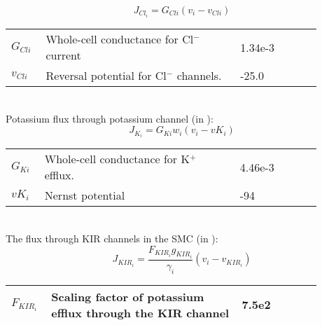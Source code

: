 \begin{equation} \label{eq:JCli}
J_{Cl_{i}} = G_{Cli} \left(  v_{i} - v_{Cli}  \right) 
\end{equation}
%
\begin{table}[h!]
\centering
\begin{tabular}{| p{0.09\linewidth} | >{\footnotesize} p{0.57\linewidth} | >{\footnotesize} p{0.2\linewidth} | >{\footnotesize} p{0.02\linewidth} |}
\arrayrulecolor{lightgrey}\hline
$G_{Cli}$      			& Whole-cell conductance for Cl$^{-}$ current		& 1.34e-3 \uMpmVs	&\cite{Koenigsberger2006} \\
$v_{Cli}$      			& Reversal potential for Cl$^{-}$ channels.			& -25.0 \mV			&\cite{Koenigsberger2006} \\
\hline
\end{tabular}
\label{tab:JCli}
\end{table}
\\
%
Potassium flux through potassium channel (in \uMs):
\begin{equation} \label{eq:JKi}
J_{K_{i}}= G_{Ki} w_{i} \left(  v_{i} - vK_i  \right) 
\end{equation}
%
\begin{table}[h!]
\centering
\begin{tabular}{| p{0.09\linewidth} | >{\footnotesize} p{0.57\linewidth} | >{\footnotesize} p{0.2\linewidth} | >{\footnotesize} p{0.02\linewidth} |}
\arrayrulecolor{lightgrey}\hline
$G_{Ki}$      			& Whole-cell conductance for K$^{+}$ efflux.			& 4.46e-3 \uMpmVs	&\cite{Koenigsberger2005} \\
$vK_i$      			& Nernst potential										& -94 \mV	&\cite{Koenigsberger2005} \\
\hline
\end{tabular}
\label{tab:JKi}
\end{table}
\\
The flux through KIR channels in the SMC (in \uMs): 
\begin{equation} \label{eq:JKIRi}
J_{KIR_{i}} =  \frac{F_{KIR_{i}} g_{KIR_{i}}}{\gamma_{i}}( v_{i} - v_{KIR_{i}})
\end{equation}
%
\begin{table}[h!]
\centering
\begin{tabular}{| p{0.09\linewidth} | >{\footnotesize} p{0.57\linewidth} | >{\footnotesize} p{0.2\linewidth} | >{\footnotesize} p{0.02\linewidth} |}
\arrayrulecolor{lightgrey}\hline
$ F_{KIR_{i}} $ & Scaling factor of potassium efflux through the KIR channel & 7.5e2 & \cite{LoesEvert} \\
\hline
\end{tabular}
\label{tab:JCli}
\end{table}

